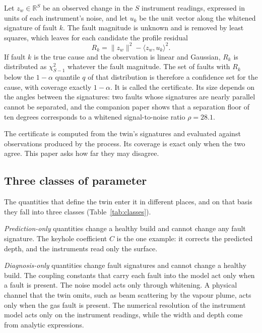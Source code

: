 \documentclass[preprint,12pt]{elsarticle}
\begin{document}
Let $z_w \in \mathbb{R}^S$ be an observed change in the $S$ instrument
readings, expressed in units of each instrument's noise, and let $u_k$ be the
unit vector along the whitened signature of fault $k$. The fault magnitude is
unknown and is removed by least squares, which leaves for each candidate the
profile residual
\begin{equation}
R_k = \|z_w\|^2 - \langle z_w, u_k\rangle^2 .
\label{eq:residual}
\end{equation}
If fault $k$ is the true cause and the observation is linear and Gaussian,
$R_k$ is distributed as $\chi^2_{S-1}$ whatever the fault magnitude. The set of
faults with $R_k$ below the $1-\alpha$ quantile $q$ of that distribution is
therefore a confidence set for the cause, with coverage exactly $1-\alpha$. It
is called the certificate. Its size depends on the angles between the
signatures: two faults whose signatures are nearly parallel cannot be
separated, and the companion paper shows that a separation floor of ten
degrees corresponds to a whitened signal-to-noise ratio $\rho = 28.1$.

The certificate is computed from the twin's signatures and evaluated against
observations produced by the process. Its coverage is exact only when the two
agree. This paper asks how far they may disagree.

\subsection{Three classes of parameter}
\label{sec:classes}

The quantities that define the twin enter it in different places, and on that
basis they fall into three classes (Table~\ref{tab:classes}).

\emph{Prediction-only} quantities change a healthy build and cannot change any
fault signature. The keyhole coefficient $C$ is the one example: it corrects
the predicted depth, and the instruments read only the surface.

\emph{Diagnosis-only} quantities change fault signatures and cannot change a
healthy build. The coupling constants that carry each fault into the model act
only when a fault is present. The noise model acts only through whitening.
A physical channel that the twin omits, such as beam scattering by the vapour
plume, acts only when the gas fault is present. The numerical resolution of the
instrument model acts only on the instrument readings, while the width and
depth come from analytic expressions.
\end{document}
